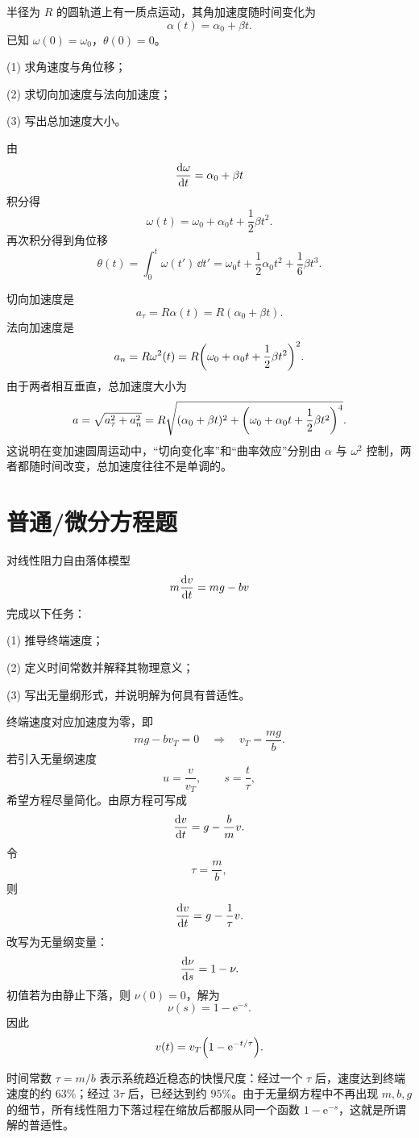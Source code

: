 \begin{university}
半径为 $R$ 的圆轨道上有一质点运动，其角加速度随时间变化为
\[
\alpha(t)=\alpha_0+\beta t.
\]
已知 $\omega(0)=\omega_0$，$\theta(0)=0$。

(1) 求角速度与角位移；

(2) 求切向加速度与法向加速度；

(3) 写出总加速度大小。

\begin{solution}
由
\[
\dv{\omega}{t}=\alpha_0+\beta t
\]
积分得
\[
\omega(t)=\omega_0+\alpha_0 t+\frac12 \beta t^2.
\]
再次积分得到角位移
\[
\theta(t)=\int_0^t \omega(t')\,\dd t'
=\omega_0 t+\frac12\alpha_0 t^2+\frac16\beta t^3.
\]

切向加速度是
\[
a_\tau=R\alpha(t)=R(\alpha_0+\beta t).
\]
法向加速度是
\[
a_n=R\omega^2(t)=R\qty(\omega_0+\alpha_0 t+\frac12\beta t^2)^2.
\]
由于两者相互垂直，总加速度大小为
\[
a=\sqrt{a_\tau^2+a_n^2}
=R\sqrt{(\alpha_0+\beta t)^2+\qty(\omega_0+\alpha_0 t+\frac12\beta t^2)^4}.
\]
这说明在变加速圆周运动中，“切向变化率”和“曲率效应”分别由 $\alpha$ 与 $\omega^2$ 控制，两者都随时间改变，总加速度往往不是单调的。
\end{solution}
\end{university}

\section*{普通/微分方程题}

\begin{problem}
对线性阻力自由落体模型
\[
m\dv{v}{t}=mg-bv
\]
完成以下任务：

(1) 推导终端速度；

(2) 定义时间常数并解释其物理意义；

(3) 写出无量纲形式，并说明解为何具有普适性。

\begin{solution}
终端速度对应加速度为零，即
\[
mg-bv_T=0 \quad\Rightarrow\quad v_T=\frac{mg}{b}.
\]
若引入无量纲速度
\[
u=\frac{v}{v_T},
\qquad
s=\frac{t}{\tau},
\]
希望方程尽量简化。由原方程可写成
\[
\dv{v}{t}=g-\frac{b}{m}v.
\]
令
\[
\tau=\frac{m}{b},
\]
则
\[
\dv{v}{t}=g-\frac{1}{\tau}v.
\]
改写为无量纲变量：
\[
\dv{\nu}{s}=1-\nu.
\]
初值若为由静止下落，则 $\nu(0)=0$，解为
\[
\nu(s)=1-\mathrm e^{-s}.
\]
因此
\[
v(t)=v_T\qty(1-\mathrm e^{-t/\tau}).
\]

时间常数 $\tau=m/b$ 表示系统趋近稳态的快慢尺度：经过一个 $\tau$ 后，速度达到终端速度的约 $63\%$；经过 $3\tau$ 后，已经达到约 $95\%$。由于无量纲方程中不再出现 $m,b,g$ 的细节，所有线性阻力下落过程在缩放后都服从同一个函数 $1-\mathrm e^{-s}$，这就是所谓解的普适性。
\end{solution}
\end{problem}

